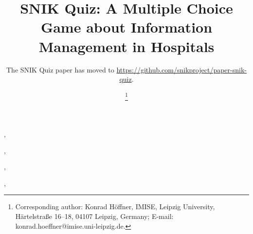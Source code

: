 \documentclass{IOS-Book-Article}     %
\def\hb{\hbox to 11.5 cm{}}
\begin{document}
\pagestyle{headings}
\def\thepage{}

\begin{frontmatter}              %


\title{SNIK Quiz: A Multiple Choice Game about Information Management in Hospitals}

\markboth{}{May 2022\hb}
\subtitle{The SNIK Quiz paper has moved to \url{https://github.com/snikproject/paper-snik-quiz}.}

\author[A]{ %
\thanks{Corresponding author: Konrad Höffner, IMISE, Leipzig University,
Härtelstraße 16--18, 04107 Leipzig, Germany; E-mail: konrad.hoeffner@imise.uni-leipzig.de.}},
\author[A]{ },
\author[A]{ },
\author[A]{ },
\author[A]{ }
\address[A]{IMISE, Leipzig University, Germany}


\end{frontmatter}
\end{document}

